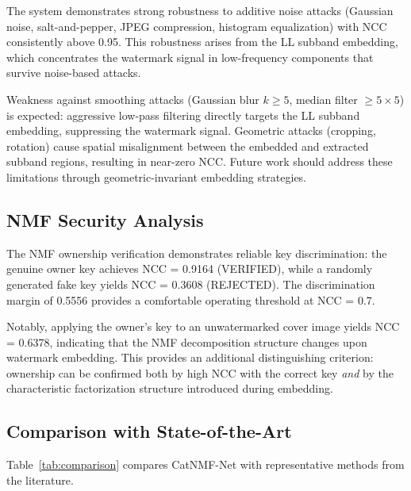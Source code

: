 \documentclass[journal]{IEEEtran}
\begin{document}
The system demonstrates strong robustness to additive noise attacks
(Gaussian noise, salt-and-pepper, JPEG compression, histogram equalization)
with NCC consistently above 0.95. This robustness arises from the
LL subband embedding, which concentrates the watermark signal in
low-frequency components that survive noise-based attacks.

Weakness against smoothing attacks (Gaussian blur $k \geq 5$, median
filter $\geq 5 \times 5$) is expected: aggressive low-pass filtering
directly targets the LL subband embedding, suppressing the watermark
signal. Geometric attacks (cropping, rotation) cause spatial
misalignment between the embedded and extracted subband regions,
resulting in near-zero NCC. Future work should address these limitations
through geometric-invariant embedding strategies.

\subsection{NMF Security Analysis}

The NMF ownership verification demonstrates reliable key discrimination:
the genuine owner key achieves NCC = 0.9164 (VERIFIED), while a randomly
generated fake key yields NCC = 0.3608 (REJECTED). The discrimination
margin of 0.5556 provides a comfortable operating threshold at NCC = 0.7.

Notably, applying the owner's key to an unwatermarked cover image yields
NCC = 0.6378, indicating that the NMF decomposition structure changes
upon watermark embedding. This provides an additional distinguishing
criterion: ownership can be confirmed both by high NCC with the correct
key \emph{and} by the characteristic factorization structure introduced
during embedding.

\subsection{Comparison with State-of-the-Art}

Table~\ref{tab:comparison} compares CatNMF-Net with representative
methods from the literature.
\end{document}
